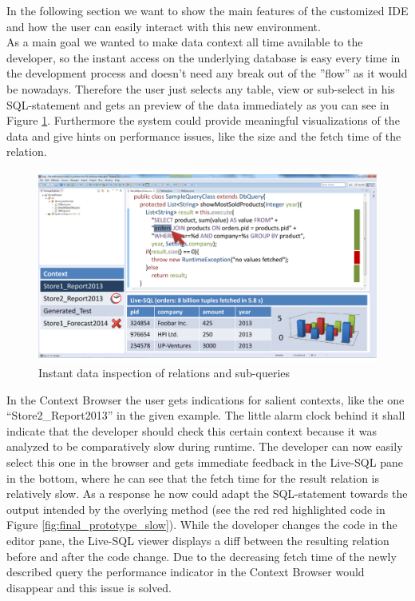 In the following section we want to show the main features of the customized IDE and how the user can easily interact with this new environment.\\
As a main goal we wanted to make data context all time available to the developer, so the instant access on the underlying database is easy every time in the development process and doesn't need any break out of the ''flow'' as it would be nowadays. Therefore the user just selects any table, view or sub-select in his SQL-statement and gets an preview of the data immediately as you can see in Figure \ref{fig:final_prototype_instant}. Furthermore the system could provide meaningful visualizations of the data and give hints on performance issues, like the size and the fetch time of the relation.\\
\begin{figure}
\begin{centering}
    \includegraphics[width=1.0\linewidth]{images/instant}
    \caption{Instant data inspection of relations and sub-queries}
    \label{fig:final_prototype_instant}
\end{centering}
\end{figure}
In the Context Browser the user gets indications for salient contexts, like the one ``Store2\_Report2013'' in the given example. The little alarm clock behind it shall indicate that the developer should check this certain context because it was analyzed to be comparatively slow during runtime. The developer can now easily select this one in the browser and gets immediate feedback in the Live-SQL pane in the bottom, where he can see that the fetch time for the result relation is relatively slow. As a response he now could adapt the SQL-statement towards the  output intended by the overlying method (see the red red highlighted code in Figure \ref{fig:final_prototype_slow}). While the doveloper changes the code in the editor pane, the Live-SQL viewer displays a diff between the resulting relation before and after the code change. Due to the decreasing fetch time of the newly described query the performance indicator in the Context Browser would disappear and this issue is solved.\\
